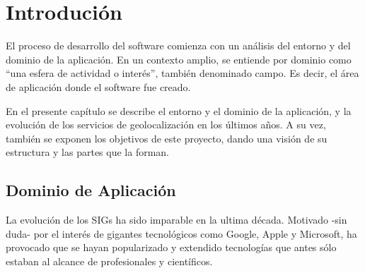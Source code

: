 \chapter[Introducción]{
  \label{chp:introduccion}
  Introdución
}
\minitoc
\newpage

El proceso de desarrollo del software comienza con un análisis del entorno y
del dominio de la aplicación. En un contexto amplio, se entiende por dominio
como ``una esfera de actividad o interés'', también denominado campo. Es decir,
el área de aplicación donde el software fue creado.

En el presente capítulo se describe el entorno y el dominio de la aplicación, y la
evolución de los servicios de geolocalización en los últimos años. A su vez,
también se exponen los objetivos de este proyecto, dando una visión
de su estructura y las partes que la forman.


\section{Dominio de Aplicación}

La evolución de los \glspl{SIG} ha sido imparable en la ultima década. Motivado 
-sin duda- por el interés de gigantes tecnológicos como Google, Apple y Microsoft, 
ha provocado que se hayan popularizado y extendido tecnologías que  antes sólo 
estaban al alcance de profesionales y científicos.

